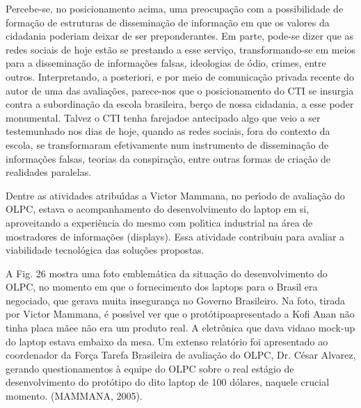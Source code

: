 \documentclass[
12pt,		%
openright,	%
twoside,  %
a4paper,			%
chapter=TITLE,		%
english,			%
french,				%
spanish,			%
brazil				%
]{USPSC-classe/USPSC}
\begin{document}
Percebe-se, no posicionamento acima, uma preocupa\c{c}\~ao com a possibilidade de forma\c{c}\~ao de estruturas de dissemina\c{c}\~ao de informa\c{c}\~ao em que os valores da cidadania poderiam deixar de ser preponderantes. Em parte, pode-se dizer que as redes sociais de hoje est\~ao se prestando a esse servi\c{c}o, transformando-se em meios para a dissemina\c{c}\~ao de informa\c{c}\~oes falsas, ideologias de \'odio, crimes, entre outros. Interpretando, a posteriori, e por meio de comunica\c{c}\~ao privada recente do autor de uma das avalia\c{c}\~oes, parece-nos que o posicionamento do CTI se insurgia contra a subordina\c{c}\~ao da escola brasileira, ber\c{c}o de nossa cidadania, a esse poder monumental. Talvez o CTI tenha \textquotedbl farejado\textquotedbl  e antecipado algo que veio a ser testemunhado nos dias de hoje, quando as redes sociais, fora do contexto da escola, se transformaram efetivamente num instrumento de dissemina\c{c}\~ao de informa\c{c}\~oes falsas, teorias da conspira\c{c}\~ao, entre outras formas de cria\c{c}\~ao de realidades paralelas.









Dentre as atividades atribu\'{\i}das a Victor Mammana, no per\'{\i}odo de avalia\c{c}\~ao do OLPC, estava o acompanhamento do desenvolvimento do laptop em si, aproveitando a experi\^encia do mesmo com pol\'{\i}tica industrial na \'area de mostradores de informa\c{c}\~oes (displays). Essa atividade contribuiu para avaliar a viabilidade tecnol\'ogica das solu\c{c}\~oes propostas.









A Fig. 26 mostra uma foto emblem\'atica da situa\c{c}\~ao do desenvolvimento do OLPC, no momento em que o fornecimento dos laptops para o Brasil era negociado, que gerava muita inseguran\c{c}a no Governo Brasileiro. Na foto, tirada por Victor Mammana, \'e poss\'{\i}vel ver que o \textquotedbl prot\'otipo\textquotedbl  apresentado a Kofi Anan n\~ao tinha \textquotedbl placa m\~ae\textquotedbl  e n\~ao era um produto real. A eletr\^onica que \textquotedbl dava vida\textquotedbl  ao mock-up do laptop estava embaixo da mesa. Um extenso relat\'orio foi apresentado ao coordenador da For\c{c}a Tarefa Brasileira de avalia\c{c}\~ao do OLPC, Dr. C\'esar Alvarez, gerando questionamentos \`a equipe do OLPC sobre o real est\'agio de desenvolvimento do prot\'otipo do dito \textquotedbl laptop de 100 d\'olares, \textquotedbl  naquele crucial momento. (MAMMANA, 2005).
\end{document}
